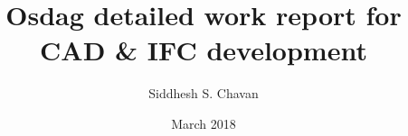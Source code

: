 

\clearpage%

\title{Osdag detailed work report for CAD \& IFC development}
\author{Siddhesh S. Chavan}
\date{March 2018}


 






\maketitle

%
% 

